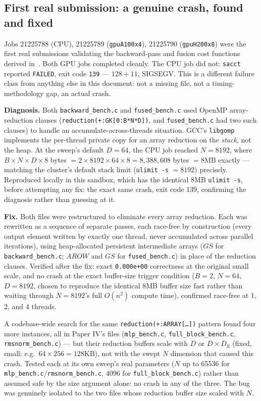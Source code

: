 \documentclass[11pt]{article}
\begin{document}
\subsection{First real submission: a genuine crash, found and fixed}
\label{sec:paper2-crash}

Jobs 21225788 (CPU), 21225789 (\texttt{gpuA100x4}), 21225790
(\texttt{gpuH200x8}) were the first real submissions validating the
backward-pass and fusion cost functions derived in~\cite{paper2}.
Both GPU jobs completed cleanly. The CPU job did not: \texttt{sacct}
reported \texttt{FAILED}, exit code \texttt{139} --- $128+11$, SIGSEGV.
This is a different failure class from anything else in this document:
not a missing file, not a timing-methodology gap, an actual crash.

\textbf{Diagnosis.} Both \texttt{backward\_bench.c} and
\texttt{fused\_bench.c} used OpenMP array-reduction clauses
(\texttt{reduction(+:GK[0:B*N*D])}, and \texttt{fused\_bench.c} had two
such clauses) to handle an accumulate-across-threads situation.
GCC's \texttt{libgomp} implements the per-thread private copy for an
array reduction on the \emph{stack}, not the heap. At the sweep's
default $D{=}64$, the CPU job reached $N{=}8192$, where $B \times N
\times D \times 8$ bytes $= 2 \times 8192 \times 64 \times 8 =
8{,}388{,}608$ bytes $= 8$MB exactly --- matching the cluster's default
stack limit (\texttt{ulimit -s} $=8192$) precisely. Reproduced locally
in this sandbox, which has the identical 8MB \texttt{ulimit -s}, before
attempting any fix: the exact same crash, exit code 139, confirming the
diagnosis rather than guessing at it.

\textbf{Fix.} Both files were restructured to eliminate every array
reduction. Each was rewritten as a sequence of separate passes, each
race-free by construction (every output element written by exactly one
thread, never accumulated across parallel iterations), using
heap-allocated persistent intermediate arrays ($GS$ for
\texttt{backward\_bench.c}; $AROW$ and $GS$ for \texttt{fused\_bench.c})
in place of the reduction clauses. Verified after the fix: exact
\texttt{0.000e+00} correctness at the original small scale, and no
crash at the exact buffer-size trigger condition ($B{=}2$, $N{=}64$,
$D{=}8192$, chosen to reproduce the identical 8MB buffer size fast
rather than waiting through $N{=}8192$'s full $O(n^2)$ compute time),
confirmed race-free at 1, 2, and 4 threads.

A codebase-wide search for the same \texttt{reduction(+:ARRAY[\ldots])}
pattern found four more instances, all in Paper IV's files
(\texttt{mlp\_bench.c}, \texttt{full\_block\_bench.c},
\texttt{rmsnorm\_bench.c}) --- but their reduction buffers scale with
$D$ or $D \times D_{\mathrm{ff}}$ (fixed, small: e.g.\ $64 \times 256 =
128$KB), not with the swept $N$ dimension that caused this crash.
Tested each at its own sweep's real parameters ($N$ up to 65536 for
\texttt{mlp\_bench.c}/\texttt{rmsnorm\_bench.c}, 4096 for
\texttt{full\_block\_bench.c}) rather than assumed safe by the size
argument alone: no crash in any of the three. The bug was genuinely
isolated to the two files whose reduction buffer size scaled with $N$.
\end{document}
